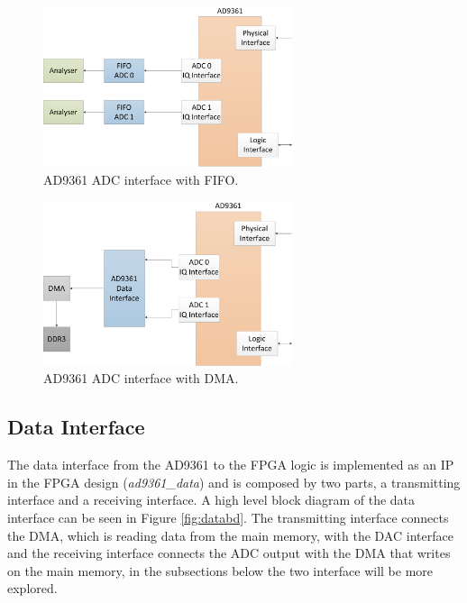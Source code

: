 \begin{figure}[htbp]
    \centering
    \includegraphics[width=0.65\textwidth]{./figures/adc_fifo}
    \caption{ AD9361 ADC interface with FIFO.
    \label{fig:ad9361rxfifo}}
\end{figure}

\begin{figure}[htbp]
    \centering
    \includegraphics[width=0.65\textwidth]{./figures/adc_dma}
    \caption{ AD9361 ADC interface with DMA.
    \label{fig:ad9361rxdma}}
\end{figure}


\subsection{Data Interface}
\label{subs:dataif}

The data interface from the AD9361 to the FPGA logic is implemented as an IP in
the FPGA design (\emph{ad9361\_data}) and is composed by two parts, a
transmitting interface and a receiving interface. A high level block diagram of
the data interface can be seen in Figure \ref{fig:databd}. The transmitting
interface connects the DMA, which is reading data from the main memory, with the
DAC interface and the receiving interface connects the ADC output with the DMA
that writes on the main memory, in the subsections below the two interface will
be more explored.

